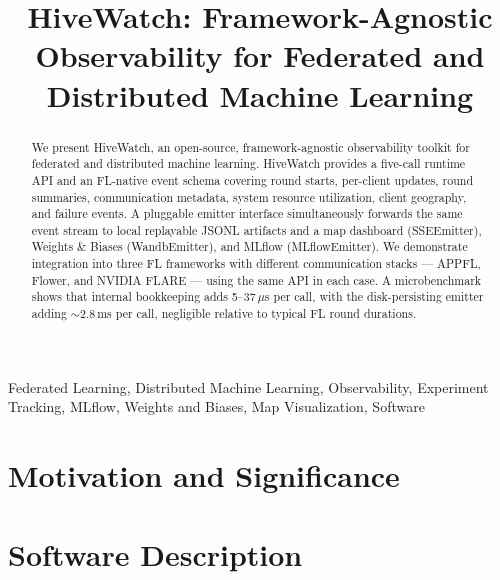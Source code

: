 \documentclass[conference]{IEEEtran}
\begin{document}
\title{HiveWatch: Framework-Agnostic Observability for Federated and Distributed Machine Learning}

\author{
}

\maketitle

\begin{abstract}
We present HiveWatch, an open-source, framework-agnostic observability toolkit for federated and distributed machine learning. HiveWatch provides a five-call runtime API and an FL-native event schema covering round starts, per-client updates, round summaries, communication metadata, system resource utilization, client geography, and failure events. A pluggable emitter interface simultaneously forwards the same event stream to local replayable JSONL artifacts and a map dashboard (SSEEmitter), Weights \& Biases (WandbEmitter), and MLflow (MLflowEmitter). We demonstrate integration into three FL frameworks with different communication stacks — APPFL, Flower, and NVIDIA FLARE — using the same API in each case. A microbenchmark shows that internal bookkeeping adds 5--37\,$\mu$s per call, with the disk-persisting emitter adding $\sim$2.8\,ms per call, negligible relative to typical FL round durations.
\end{abstract}

\begin{IEEEkeywords}
Federated Learning, Distributed Machine Learning, Observability, Experiment Tracking, MLflow, Weights and Biases, Map Visualization, Software
\end{IEEEkeywords}

\section{Motivation and Significance}
\label{sec:motivation}


\section{Software Description}
\label{sec:software}

\end{document}
